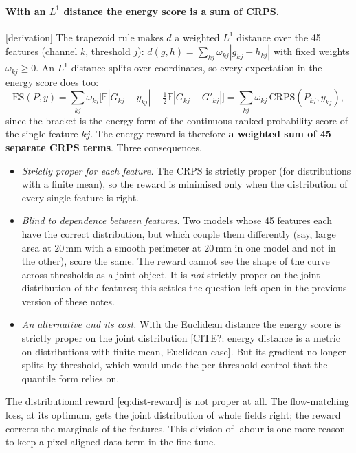 \documentclass[11pt,a4paper]{article}
\newcommand{\E}{\mathbb{E}}
\newcommand{\citeq}[1]{\textcolor{red!70!black}{[CITE?: #1]}}
\newcommand{\status}[1]{\textsf{\small[#1]}}
\begin{document}
\paragraph{With an $L^1$ distance the energy score is a sum of CRPS.} \status{derivation} The trapezoid rule makes $d$ a
weighted $L^1$ distance over the 45 features (channel $k$, threshold $j$): $d(g,h) = \sum_{kj}\omega_{kj}|g_{kj} -
h_{kj}|$ with fixed weights $\omega_{kj}\ge0$. An $L^1$ distance splits over coordinates, so every expectation in the
energy score does too:
\begin{equation}
  \mathrm{ES}(P,y) = \sum_{kj}\omega_{kj}\Big[\E|G_{kj}-y_{kj}| - \tfrac12\E|G_{kj}-G'_{kj}|\Big]
  = \sum_{kj}\omega_{kj}\,\mathrm{CRPS}(P_{kj}, y_{kj}),
\end{equation}
since the bracket is the energy form of the continuous ranked probability score of the single feature $kj$. The energy
reward is therefore \textbf{a weighted sum of 45 separate CRPS terms}. Three consequences.
\begin{itemize}[nosep,leftmargin=1.2em]
\item \emph{Strictly proper for each feature.} The CRPS is strictly proper (for distributions with a finite mean), so
the reward is minimised only when the distribution of every single feature is right.
\item \emph{Blind to dependence between features.} Two models whose 45 features each have the correct distribution, but
which couple them differently (say, large area at 20\,mm with a smooth perimeter at 20\,mm in one model and not in the
other), score the same. The reward cannot see the shape of the curve across thresholds as a joint object. It is
\emph{not} strictly proper on the joint distribution of the features; this settles the question left open in the
previous version of these notes.
\item \emph{An alternative and its cost.} With the Euclidean distance the energy score is strictly proper on the joint
distribution \citeq{energy distance is a metric on distributions with finite mean, Euclidean case}. But its gradient no
longer splits by threshold, which would undo the per-threshold control that the quantile form relies on.
\end{itemize}
The distributional reward \eqref{eq:dist-reward} is not proper at all. The flow-matching loss, at its optimum, gets the
joint distribution of whole fields right; the reward corrects the marginals of the features. This division of labour is
one more reason to keep a pixel-aligned data term in the fine-tune.
\end{document}
